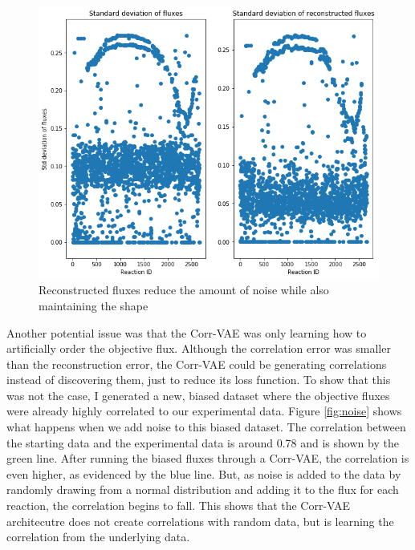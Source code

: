 \begin{figure}[t!]
\begin{center}
\includegraphics[width=1.01\textwidth]{figs/Reconstructed_stds.png}
\caption[Reconstructing fluxes reduces the amount of noise]{Reconstructed fluxes reduce the amount of noise while also maintaining the shape}
\label{fig:recon_stds}
\end{center}
\end{figure}

Another potential issue was that the Corr-VAE was only learning how to artificially order the objective flux.
Although the correlation error was smaller than the reconstruction error, the Corr-VAE could be generating correlations instead of discovering them, just to reduce its loss function.
To show that this was not the case, I generated a new, biased dataset where the objective fluxes were already highly correlated to our experimental data.
Figure \ref{fig:noise} shows what happens when we add noise to this biased dataset.
The correlation between the starting data and the experimental data is around 0.78 and is shown by the green line.
After running the biased fluxes through a Corr-VAE, the correlation is even higher, as evidenced by the blue line.
But, as noise is added to the data by randomly drawing from a normal distribution and adding it to the flux for each reaction, the correlation begins to fall.
This shows that the Corr-VAE architecutre does not create correlations with random data, but is learning the correlation from the underlying data.

